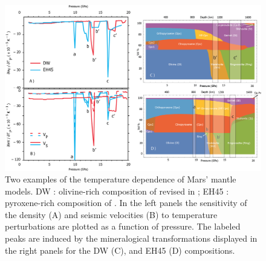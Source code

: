 \begin{figure}[h!]
\begin{center}
\includegraphics[width=1.0\textwidth]
{figures/Fig_dT.png}
\caption{Two examples of the temperature dependence of Mars' mantle models. DW : olivine-rich composition of \citet{Dreibus1984} revised in \citep{Taylor2013}; EH45 : pyroxene-rich composition of \citet{Sanloup1999}. In the left panels the sensitivity of the density (A) and seismic velocities (B) to temperature perturbations are plotted as a function of pressure. The labeled peaks are induced by the mineralogical transformations displayed in the right panels for the DW (C), and EH45 (D) compositions.}
\label{fig:Fig_dT.png} 
\end{center}
\end{figure}

